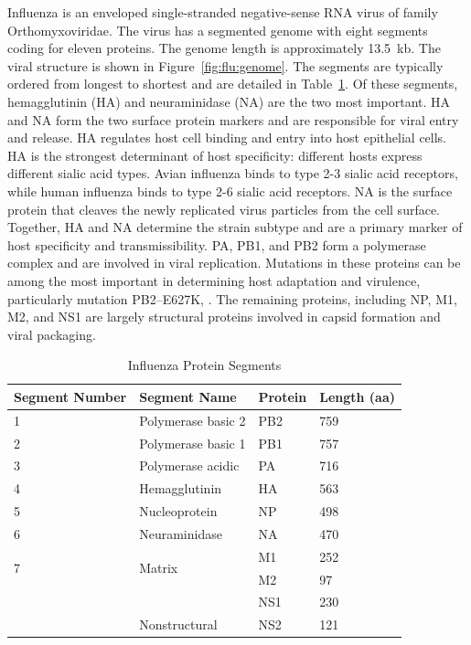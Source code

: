 Influenza is an enveloped single-stranded negative-sense RNA virus of family Orthomyxoviridae.
The virus has a segmented genome with eight segments coding for eleven proteins.
The genome length is approximately 13.5~kb.
The viral structure is shown in Figure~\ref{fig:flu:genome}.
The segments are typically ordered from longest to shortest and are detailed in Table~\ref{table:influenza_genome_segments}.
Of these segments, hemagglutinin (HA) and neuraminidase (NA) are the two most important.
HA and NA form the two surface protein markers and are responsible for viral entry and release.
HA regulates host cell binding and entry into host epithelial cells.
HA is the strongest determinant of host specificity: different hosts express different sialic acid types.
Avian influenza binds to type 2-3 sialic acid receptors, while human influenza binds to type 2-6 sialic acid receptors.
NA is the surface protein that cleaves the newly replicated virus particles from the cell surface.
Together, HA and NA determine the strain subtype and are a primary marker of host specificity and transmissibility.
PA, PB1, and PB2 form a polymerase complex and are involved in viral replication.
Mutations in these proteins can be among the most important in determining host adaptation and virulence, particularly mutation PB2--E627K, \cite{Subbarao:1993tt,Hatta:2001cw}. 
The remaining proteins, including NP, M1, M2, and NS1 are largely structural proteins involved in capsid formation and viral packaging.

\begin{table}
\centering
\caption{Influenza Protein Segments}
\small
\setlength{\aboverulesep}{0pt}
\setlength{\belowrulesep}{0pt}
\setlength{\extrarowheight}{.75ex}
\begin{tabularx}{\textwidth}{XXXX}
\toprule\rowcolor{gray!50}
Segment Number & Segment Name & Protein & Length (aa) \\
\midrule
                   1 & Polymerase basic 2 & PB2 & 759 \\
\rowcolor{gray!25} 2 & Polymerase basic 1 & PB1 & 757 \\
                   3 & Polymerase acidic  & PA  & 716 \\
\rowcolor{gray!25} 4 & Hemagglutinin      & HA  & 563 \\
                   5 & Nucleoprotein      & NP  & 498\\
\rowcolor{gray!25} 6 & Neuraminidase      & NA  & 470\\
\multirow{2}{*}{7} & \multirow{2}{*}{Matrix}  & M1  & 252 \\
				   &                          & M2  & 97 \\
\rowcolor{gray!25}                      &                                 & NS1 & 230 \\
\rowcolor{gray!25} \multirow{-2}{*}{8}  & \multirow{-2}{*}{Nonstructural} & NS2 & 121 \\
\bottomrule
\end{tabularx}
\label{table:influenza_genome_segments}
\end{table}

